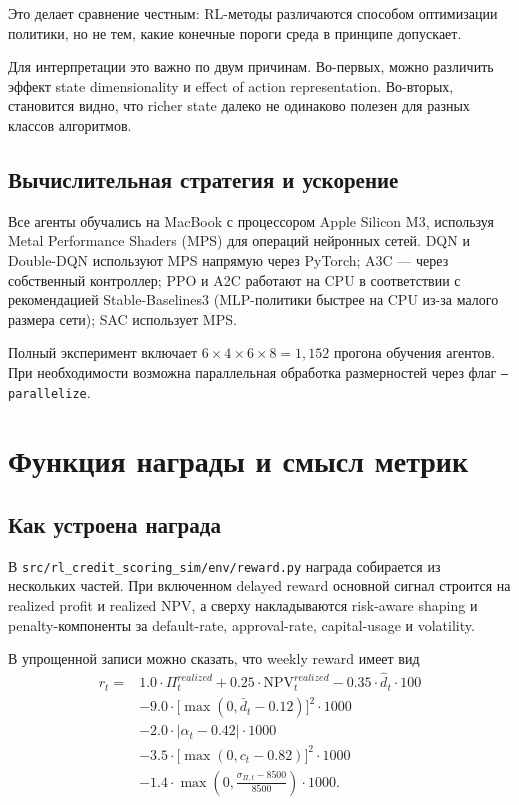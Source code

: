 \documentclass[12pt,a4paper]{article}
\begin{document}
Это делает сравнение честным: RL-методы различаются способом оптимизации политики, но не тем, какие конечные пороги среда в принципе допускает.

Для интерпретации это важно по двум причинам. Во-первых, можно различить эффект state dimensionality и effect of action representation. Во-вторых, становится видно, что richer state далеко не одинаково полезен для разных классов алгоритмов.

\subsection{Вычислительная стратегия и ускорение}

Все агенты обучались на MacBook с процессором Apple Silicon M3, используя
Metal Performance Shaders (MPS) для операций нейронных сетей. DQN и Double-DQN
используют MPS напрямую через PyTorch; A3C --- через собственный контроллер;
PPO и A2C работают на CPU в соответствии с рекомендацией Stable-Baselines3
(MLP-политики быстрее на CPU из-за малого размера сети); SAC использует MPS.

Полный эксперимент включает $6 \times 4 \times 6 \times 8 = 1{,}152$ прогона
обучения агентов. При необходимости возможна параллельная обработка размерностей
через флаг \texttt{--parallelize}.

\section{Функция награды и смысл метрик}

\subsection{Как устроена награда}

В \texttt{src/rl\_credit\_scoring\_sim/env/reward.py} награда собирается из нескольких частей. При включенном delayed reward основной сигнал строится на realized profit и realized NPV, а сверху накладываются risk-aware shaping и penalty-компоненты за default-rate, approval-rate, capital-usage и volatility.

В упрощенной записи можно сказать, что weekly reward имеет вид
\begin{equation}
\label{eq:ru-reward}
\begin{aligned}
r_t ={}& 1.0 \cdot \Pi^{realized}_t + 0.25 \cdot \mathrm{NPV}^{realized}_t - 0.35 \cdot \hat d_t \cdot 100 \\
&- 9.0 \cdot \bigl[\max(0, \bar d_t - 0.12)\bigr]^2 \cdot 1000 \\
&- 2.0 \cdot \left|\alpha_t - 0.42\right| \cdot 1000 \\
&- 3.5 \cdot \bigl[\max(0, c_t - 0.82)\bigr]^2 \cdot 1000 \\
&- 1.4 \cdot \max\!\left(0, \frac{\sigma_{\Pi,t} - 8500}{8500}\right) \cdot 1000.
\end{aligned}
\end{equation}
\end{document}
